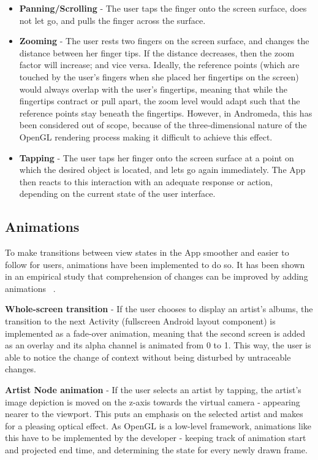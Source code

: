 \begin{itemize}
	\item \textbf{Panning/Scrolling} - The user taps the finger onto the screen surface, does not let 
	go, and pulls the finger across the surface.
	\item \textbf{Zooming} - The user rests two fingers on the screen surface, and changes the distance	between her finger tips. If the distance decreases, then the zoom factor will increase; and vice versa.	Ideally, the reference points (which are touched by the user's fingers when she placed her fingertips on the screen) would always overlap with the user's fingertips, meaning that while the fingertips contract or pull apart, the zoom level would adapt such that the reference points stay beneath the fingertips. However, in Andromeda, this has been considered out of scope, because of the three-dimensional nature of the OpenGL	rendering process making it difficult to achieve this effect.
	\item \textbf{Tapping} - The user taps her finger onto the screen surface at a point on which the
	desired object is located, and lets go again immediately. The App then reacts to this interaction
	with an adequate response or action, depending on the current state of the user interface.
\end{itemize}

\subsection{Animations}

To make transitions between view states in the App smoother and easier to follow for users, animations have been implemented to do so. It has been shown in an empirical study that comprehension of changes can be improved by adding animations ~\cite{Schlienger:2007}.

\textbf{Whole-screen transition} - If the user chooses to display an artist's albums, the transition to the next Activity (fullscreen Android layout component) is implemented as a fade-over animation, meaning that the second screen is added as an overlay and its alpha channel is animated from 0 to 1. This way, the user is able to notice the change of context without being disturbed by untraceable changes.

\textbf{Artist Node animation} - If the user selects an artist by tapping, the artist's image depiction is moved on the z-axis towards the virtual camera - appearing nearer to the viewport. This puts an emphasis on the selected artist and makes for a pleasing optical effect. As OpenGL is a low-level framework, animations like this have to be implemented by the developer - keeping track of animation start and projected end time, and determining the state for every newly drawn frame.

